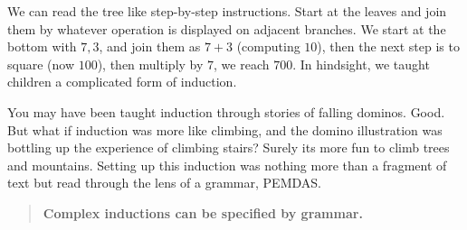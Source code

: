 We can read the tree like step-by-step instructions.  Start at the leaves and join
them by whatever operation is displayed on adjacent branches.
We start at the bottom with $7,3$, and join them as $7+3$ (computing $10$),
then the next step is to square (now $100$), then multiply by $7$, we reach $700$.
In hindsight, we taught children a complicated form of induction.

You may have been taught induction through stories of falling 
dominos.  Good.  But what if induction was more like climbing, 
and the domino illustration was bottling up the experience
of climbing stairs?  Surely its more fun to climb trees and mountains.
Setting up this induction was nothing more than a fragment of text but 
read through the lens of a grammar, PEMDAS.

\begin{quote}
    \textbf{Complex inductions can be specified by grammar.}
\end{quote}
